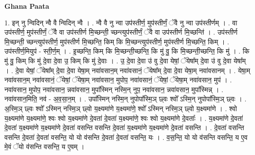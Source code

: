 \documentclass[17pt]{extarticle}
\begin{document}
\textbf{Ghana Paata } \newline

1. इन् नु न्विदिन् न्वै वै न्विदिन् न्वै । . न्वै वै नु न्वा उप॑स्तीर्ण॒ मुप॑स्तीर्णं॒ ॅवै नु न्वा उप॑स्तीर्णम् । . वा उप॑स्तीर्ण॒ मुप॑स्तीर्णं॒ ॅवै वा उप॑स्तीर्ण मि॒च्छन्ती॒ च्छन्त्युप॑स्तीर्णं॒ ॅवै वा उप॑स्तीर्ण मि॒च्छन्ति॑ । . उप॑स्तीर्ण मि॒च्छन्ती॒ च्छन्त्युप॑स्तीर्ण॒ मुप॑स्तीर्ण मि॒च्छन्ति॒ किम् कि मि॒च्छन्त्युप॑स्तीर्ण॒ मुप॑स्तीर्ण मि॒च्छन्ति॒ किम् । . उप॑स्तीर्ण॒मियुप॑ - स्ती॒र्ण॒म् । . इ॒च्छन्ति॒ किम् कि मि॒च्छन्ती॒च्छन्ति॒ कि मु॑ वु॒ कि मि॒च्छन्ती॒च्छन्ति॒ कि मु॑ । . कि मु॑ वु॒ किम् कि मु॑ दे॒वा दे॒वा उ॒ किम् कि मु॑ दे॒वाः । . उ॒ दे॒वा दे॒वा उ॑ वु दे॒वा येषां॒ ॅयेषा᳚म् दे॒वा उ॑ वु दे॒वा येषा᳚म् । . दे॒वा येषां॒ ॅयेषा᳚म् दे॒वा दे॒वा येषा॒म् नवा॑वसान॒म् नवा॑वसानं॒ ॅयेषा᳚म् दे॒वा दे॒वा 
येषा॒म् नवा॑वसानम् । . येषा॒म् नवा॑वसान॒म् नवा॑वसानं॒ ॅयेषां॒ ॅयेषा॒म् नवा॑वसान॒ मुपोप॒ नवा॑वसानं॒ ॅयेषां॒ ॅयेषा॒म् नवा॑वसान॒ मुप॑ । . नवा॑वसान॒ मुपोप॒ नवा॑वसान॒ न्नवा॑वसान॒ मुपा᳚स्मिन् नस्मि॒न् नुप॒ नवा॑वसान॒ न्नवा॑वसान॒ मुपा᳚स्मिन्न् । . नवा॑वसान॒मिति॒ नव॑ - अ॒व॒सा॒न॒म् । . उपा᳚स्मिन् नस्मि॒न् नुपोपा᳚स्मि॒ञ् छ्वः श्वो᳚ ऽस्मि॒न् नुपोपा᳚स्मि॒ञ् छ्वः । . अ॒स्मि॒ञ् छ्वः श्वो᳚ ऽस्मिन् नस्मि॒ञ् छ्वो य॒क्ष्यमा॑णे य॒क्ष्यमा॑णे॒ श्वो᳚ ऽस्मिन् नस्मि॒ञ् छ्वो य॒क्ष्यमा॑णे । . श्वो य॒क्ष्यमा॑णे य॒क्ष्यमा॑णे॒ श्वः श्वो य॒क्ष्यमा॑णे दे॒वता॑ दे॒वता॑ य॒क्ष्यमा॑णे॒ श्वः श्वो य॒क्ष्यमा॑णे दे॒वताः᳚ । . य॒क्ष्यमा॑णे दे॒वता॑ दे॒वता॑ य॒क्ष्यमा॑णे य॒क्ष्यमा॑णे दे॒वता॑ वसन्ति वसन्ति दे॒वता॑ य॒क्ष्यमा॑णे य॒क्ष्यमा॑णे दे॒वता॑ वसन्ति । . दे॒वता॑ वसन्ति वसन्ति दे॒वता॑ दे॒वता॑ वसन्ति॒ यो यो व॑सन्ति दे॒वता॑ दे॒वता॑ वसन्ति॒ यः । . व॒स॒न्ति॒ यो यो व॑सन्ति वसन्ति॒ य ए॒व मे॒वं ॅयो व॑सन्ति वसन्ति॒ य ए॒वम् । \newline
\end{document}
